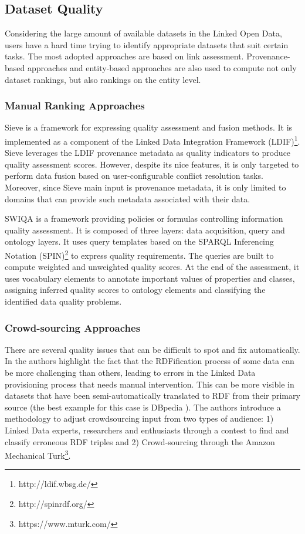 \documentclass[onecolumn, crcready]{iosart2c}
\begin{document}
\subsection{Dataset Quality}
Considering the large amount of available datasets in the Linked Open Data, users have a hard time trying to identify appropriate datasets that suit certain tasks. The most adopted approaches are based on link assessment. Provenance-based approaches and entity-based approaches are also used to compute not only dataset rankings, but also rankings on the entity level.\\

\subsubsection{Manual Ranking Approaches}

Sieve \cite{Mendes2012} is a framework for expressing quality assessment and fusion methods. It is implemented as a component of the Linked Data Integration Framework (LDIF)\footnote{http://ldif.wbsg.de/}. Sieve leverages the LDIF provenance metadata as quality indicators to produce quality assessment scores. However, despite its nice features, it is only targeted to perform data fusion based on user-configurable conflict resolution tasks. Moreover, since Sieve main input is provenance metadata, it is only limited to domains that can provide such metadata associated with their data.

SWIQA \cite{Furber2011a} is a framework providing policies or formulas controlling information quality assessment. It is composed of three layers: data acquisition, query and ontology layers. It uses query templates based on the SPARQL Inferencing Notation (SPIN)\footnote{http://spinrdf.org/} to express quality requirements. The queries are built to compute weighted and unweighted quality scores. At the end of the assessment, it uses vocabulary elements to annotate important values of properties and classes, assigning inferred quality scores to ontology elements and classifying the identified data quality problems.

\subsubsection{Crowd-sourcing Approaches}

There are several quality issues that can be difficult to spot and fix automatically. In \cite{Acosta2013} the authors highlight the fact that the RDFification process of some data can be more challenging than others, leading to errors in the Linked Data provisioning process that needs manual intervention. This can be more visible in datasets that have been semi-automatically translated to RDF from their primary source (the best example for this case is DBpedia \cite{bizer_dbpedia_2009}). The authors introduce a methodology to adjust crowdsourcing input from two types of audience: 1) Linked Data experts, researchers and enthusiasts through a contest to find and classify erroneous RDF triples and 2) Crowd-sourcing through the Amazon Mechanical Turk\footnote{https://www.mturk.com/}.
\end{document}

